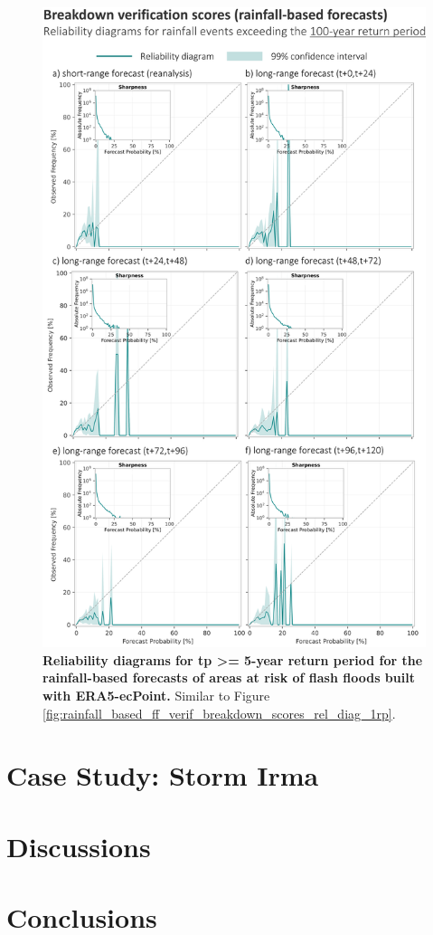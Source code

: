 \begin{figure}[htbp]
\centering
\includegraphics[width=\textwidth]{rainfall_based_ff_verif_breakdown_scores_rel_diag_100rp.png}
\caption{\textbf{Reliability diagrams for tp >= 5-year return period for the rainfall-based forecasts of areas at risk of flash floods built with ERA5-ecPoint.} Similar to Figure \ref{fig:rainfall_based_ff_verif_breakdown_scores_rel_diag_1rp}.}
\label{fig:rainfall_based_ff_verif_breakdown_scores_rel_diag_100rp}
\end{figure}


\section{Case Study: Storm Irma}
\label{flash_flood_focused_verification_rainfall_based_ff_CASE_STUDY}


\section{Discussions}
\label{flash_flood_focused_verification_rainfall_based_ff_DISCUSSIONS}


\section{Conclusions}
\label{flash_flood_focused_verification_rainfall_based_ff_CONCLUSIONS}
